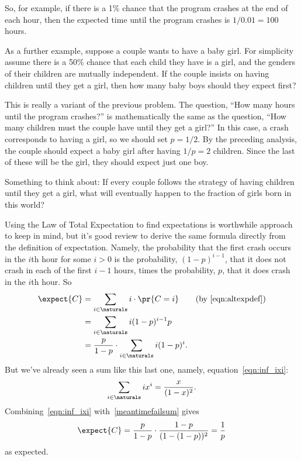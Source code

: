 So, for example, if there is a 1\% chance that the program crashes at
the end of each hour, then the expected time until the program crashes
is $1 / 0.01 = 100$ hours.  

As a further example, suppose a couple wants to have a baby girl.
For simplicity assume there is a 50\% chance that each child they have
is a girl, and the genders of their children are mutually independent.
If the couple insists on having children until they get a girl, then
how many baby boys should they expect first?

This is really a variant of the previous problem.  The question, ``How
many hours until the program crashes?'' is mathematically the same as
the question, ``How many children must the couple have until they get
a girl?''  In this case, a crash corresponds to having a girl, so we
should set $p = 1/2$.  By the preceding analysis, the couple
should expect a baby girl after having $1/p = 2$ children.  Since the
last of these will be the girl, they should expect just one boy.

Something to think about: If every couple follows the strategy of having
children until they get a girl, what will eventually happen to the
fraction of girls born in this world?

Using the Law of Total Expectation to find expectations is worthwhile
approach to keep in mind, but it's good review to derive the same
formula directly from the definition of expectation.  Namely, the
probability that the first crash occurs in the $i$th hour for some $i
>0$ is the probability, $(1-p)^{i-1}$, that it does not crash in each
of the first $i-1$ hours, times the probability, $p$, that it does
crash in the $i$th hour.  So
\begin{align}
\expect{C} & = \sum_{i \in \naturals} i \cdot \pr{C=i}
               & \text{(by~\eqref{eqn:altexpdef})}\notag\\
           & = \sum_{i \in \naturals} i (1-p)^{i-1}p\notag\\
           &= \frac{p}{1-p} \cdot \sum_{i \in \naturals} i (1-p)^i.\label{meantimefailsum}
\end{align}
But we've already seen a sum like this last one, namely, equation~\eqref{eqn:inf_ixi}:
\[
\sum_{i \in \naturals} ix^i =\frac{x}{(1-x)^2}.
\]
Combining~\eqref{eqn:inf_ixi} with~\eqref{meantimefailsum} gives
\[
\expect{C} = \frac{p}{1-p} \cdot \frac{1-p}{(1-(1-p))^2} = \frac{1}{p}
\]
as expected.

